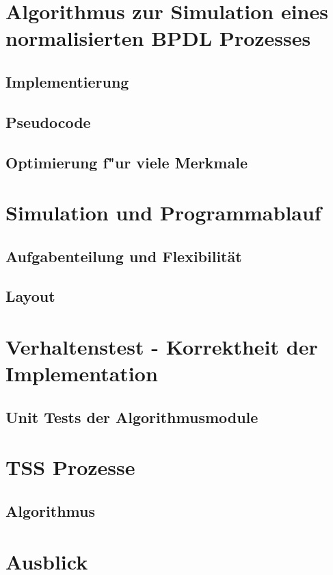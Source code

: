 \documentclass[11pt, a4paper, german]{article}
\begin{document}
\section{Algorithmus zur Simulation eines normalisierten BPDL Prozesses}
	\subsection{Implementierung}
	
	\subsection{Pseudocode}

	\subsection{Optimierung f"ur viele Merkmale}
	
\clearpage

\section{Simulation und Programmablauf}

	\subsection{Aufgabenteilung und Flexibilität}
	
	\subsection{Layout}


\clearpage
\section{Verhaltenstest - Korrektheit der Implementation}
	\subsection{Unit Tests der Algorithmusmodule}

\clearpage
\section{TSS Prozesse}

	\subsection{Algorithmus}
	
\clearpage
\section{Ausblick}

\clearpage
%
\end{document}
